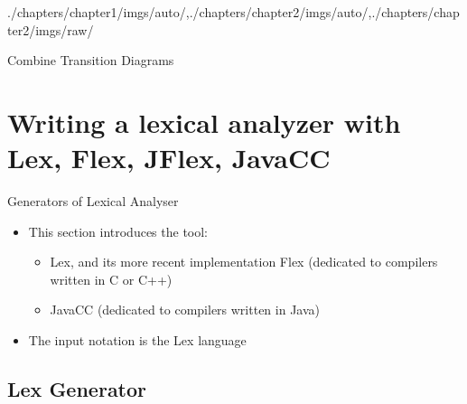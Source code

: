 \begin{graphicspathcontext}{{./chapters/chapter1/imgs/auto/},{./chapters/chapter2/imgs/auto/},{./chapters/chapter2/imgs/raw/}}
\begin{bibunit}[apalike]
\begin{frame}{Combine Transition Diagrams \insertcontinuationtext}
	\vspace{.5cm}
\end{frame}

\section[Generators of lexical analyser]{Writing a lexical analyzer with Lex, Flex, JFlex, JavaCC}
\sectiontableofcontentslide

\begin{frame}{Generators of Lexical Analyser}
	\begin{itemize}
	\item This section introduces the tool:
		\begin{itemize}
			\item Lex, and its more recent implementation Flex (dedicated to compilers written in C or C++)
			\item JavaCC (dedicated to compilers written in Java)
		\end{itemize} 
	\item The input notation is the Lex language
	\end{itemize}
	\vfill
\end{frame}

\subsection{Lex Generator}


\end{bibunit}
\end{graphicspathcontext}
